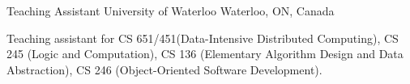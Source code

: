 

\begin{cventries}

   \cventry
    {Teaching Assistant} %
    {University of Waterloo} %
    {Waterloo, ON, Canada} %
    {} %
    {
      \begin{cvitems} %
      \item {Teaching assistant for CS 651/451(Data-Intensive Distributed Computing), CS 245 (Logic and Computation), CS 136 (Elementary Algorithm Design and Data Abstraction), CS 246 (Object-Oriented Software Development).}
      \end{cvitems}
    }
\end{cventries}
